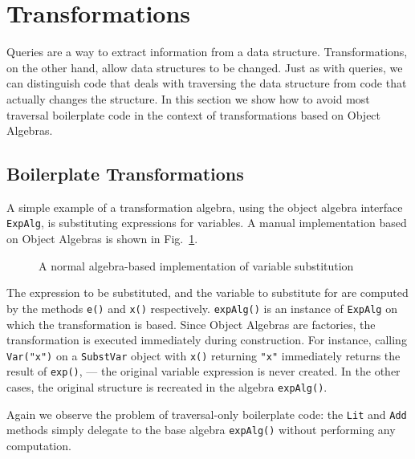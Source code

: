 \section{Transformations}\label{sec:transformations}
\label{retroimp}

Queries are a way to extract information from a data structure.
Transformations, on the other hand, allow data structures to be
changed. Just as with queries, we can distinguish code that deals with
traversing the data structure from code that actually changes the
structure. In this section we show how to avoid most traversal
boilerplate code in the context of transformations based on Object
Algebras.


\subsection{Boilerplate Transformations}\label{subsec:substvars}

A simple example of a transformation algebra, using the object
algebra interface \lstinline{ExpAlg}, is substituting expressions for
variables. A manual implementation based on Object Algebras is shown
in Fig.~\ref{substvars_without_id}.

\begin{figure}[t]
\nocaptionrule
\caption{A normal algebra-based implementation of variable substitution}
\label{substvars_without_id}
\end{figure}

The expression to be substituted, and the variable to substitute for
are computed by the methods \lstinline{e()} and \lstinline{x()}
respectively. \lstinline{expAlg()} is an instance of
\lstinline{ExpAlg} on which the transformation is based. Since Object
Algebras are factories, the transformation is executed immediately
during construction. For instance, calling \lstinline{Var("x")} on a
\lstinline{SubstVar} object with \lstinline{x()} returning
\lstinline{"x"} immediately returns the result of \lstinline{exp()},
--- the original variable expression is never created. In the other
cases, the original structure is recreated in the algebra
\lstinline{expAlg()}.

Again we observe the problem of traversal-only boilerplate code: the
\lstinline{Lit} and \lstinline{Add} methods simply delegate to the
base algebra \lstinline{expAlg()} without performing any computation.

